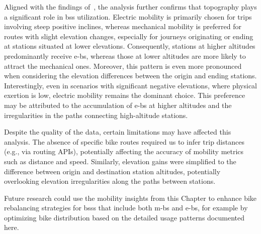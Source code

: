 Aligned with the findings of~\cite{Morency2015, Kim2020}, the analysis further confirms that topography plays a significant role in \ac{bss} utilization. Electric mobility is primarily chosen for trips involving steep positive inclines, whereas mechanical mobility is preferred for routes with slight elevation changes, especially for journeys originating or ending at stations situated at lower elevations. Consequently, stations at higher altitudes predominantly receive \acp{e-b}, whereas those at lower altitudes are more likely to attract the mechanical ones. Moreover, this pattern is even more pronounced when considering the elevation differences between the origin and ending stations. Interestingly, even in scenarios with significant negative elevations, where physical exertion is low, electric mobility remains the dominant choice. This preference may be attributed to the accumulation of \acp{e-b} at higher altitudes and the irregularities in the paths connecting high-altitude stations.

Despite the quality of the data, certain limitations may have affected this analysis. The absence of specific bike routes required us to infer trip distances (e.g., via routing APIs), potentially affecting the accuracy of mobility metrics such as distance and speed. Similarly, elevation gains were simplified to the difference between origin and destination station altitudes, potentially overlooking elevation irregularities along the paths between stations.

Future research could use the mobility insights from this Chapter to enhance bike rebalancing strategies for \acp{bss} that include both \acp{m-b} and \acp{e-b}, for example by optimizing bike distribution based on the detailed usage patterns documented here.